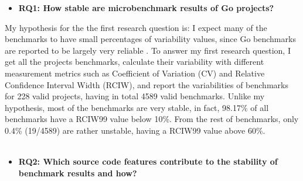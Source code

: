 \documentclass{seal_thesis}
\begin{document}
\begin{itemize}
	\item \textbf{RQ1: How stable are microbenchmark results of Go projects?}
\end{itemize}

\noindent My hypothesis for the the first research question is: I expect many of the benchmarks to have small percentages of variability values, since Go benchmarks are reported to be largely very reliable \cite{Laaber:2018:EOS:3196398.3196407}. To answer my first research question, I get all the projects benchmarks, calculate their variability with different measurement metrics such as Coefficient of Variation (CV) and Relative Confidence Interval Width (RCIW), and report the variabilities of benchmarks for 228 valid projects, having in total 4589 valid benchmarks. Unlike my hypothesis, most of the benchmarks are very stable, in fact, 98.17\% of all benchmarks have a RCIW99 value below 10\%. From the rest of benchmarks, only 0.4\% (19/4589) are rather unstable, having a RCIW99 value above 60\%.\\
\\
\begin{itemize}
	\item \textbf{RQ2: Which source code features contribute to the stability of benchmark results and how?}
\end{itemize}
\end{document}
